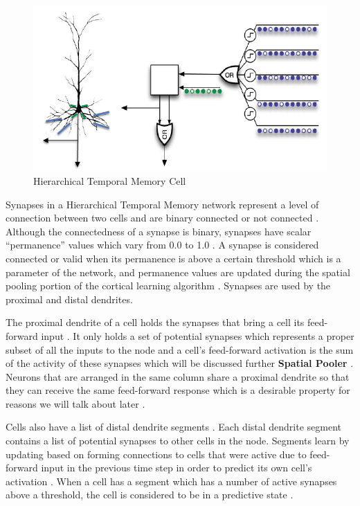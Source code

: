 \documentclass[oneside,12pt,openany]{book}
\begin{document}
	\begin{figure}[h!]
		\centering
		\includegraphics[width=\linewidth]{images/HTMCell.jpg}
		\caption{Hierarchical Temporal Memory Cell}
		\label{fig 1}
	\end{figure}
	
	Synapses in a Hierarchical Temporal Memory network represent a level of connection between two cells and are binary connected or not connected \cite{Whitepaper}. Although the connectedness of a synapse is binary, synapses have scalar ``permanence'' values which vary from 0.0 to 1.0 \cite{Principles}. A synapse is considered connected or valid when its permanence is above a certain threshold which is a parameter of the network, and permanence values are updated during the spatial pooling portion of the cortical learning algorithm \cite{Whitepaper}. Synapses are used by the proximal and distal dendrites.
	
	The proximal dendrite of a cell holds the synapses that bring a cell its feed-forward input \cite{Principles}. It only holds a set of potential synapses which represents a proper subset of all the inputs to the node and a cell's feed-forward activation is the sum of the activity of these synapses which will be discussed further \textbf{Spatial Pooler} \cite{Whitepaper}. Neurons that are arranged in the same column share a proximal dendrite so that they can receive the same feed-forward response which is a desirable property for reasons we will talk about later \cite{Whitepaper}.
	
	Cells also have a list of distal dendrite segments \cite{Whitepaper}. Each distal dendrite segment contains a list of potential synapses to other cells in the node. Segments learn by updating based on forming connections to cells that were active due to feed-forward input in the previous time step in order to predict its own cell's activation \cite{Whitepaper}. When a cell has a segment which has a number of active synapses above a threshold, the cell is considered to be in a predictive state \cite{Principles}.
	
\end{document}
